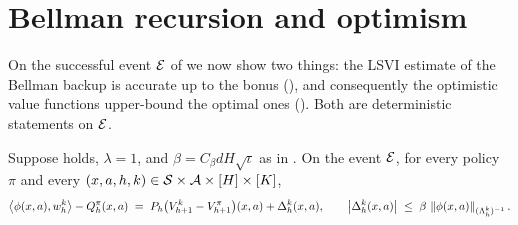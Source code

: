 \section{Bellman recursion and optimism}\label{sec:optimism}

On the successful event $\mathcal{E}$ of  we now show two
things: the LSVI estimate of the Bellman backup is accurate up to the bonus
(), and consequently the optimistic value functions
upper-bound the optimal ones (). Both are deterministic
statements on $\mathcal{E}$.

\begin{lemma}\label{lem:recursion}
Suppose  holds, $\lambda=1$, and $\beta=C_\beta dH
\sqrt{\iota}$ as in . On the event $\mathcal{E}$, for every
policy $\pi$ and every $(x,a,h,k)\in\mathcal{S}\times\mathcal{A}\times[H]\times[K]$,
\begin{align}\label{eq:recursion}
\left\langle \phi(x,a), w_h^k \right\rangle - Q_h^\pi(x,a)
\;=\; P_h\big(V_{h+1}^k - V_{h+1}^\pi\big)(x,a) + \Delta_h^k(x,a),
\qquad
\big|\Delta_h^k(x,a)\big| \;\le\; \beta\,\left\| \phi(x,a) \right\|_{(\Lambda_h^k)^{-1}}.
\end{align}
\end{lemma}

